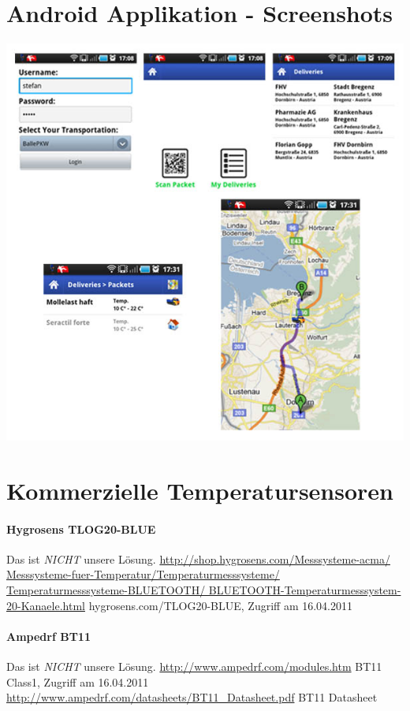 \begin{appendix}
\label{sec:appendix}

\section{Android Applikation - Screenshots}

\includegraphics[width=140mm]{files/AndroidApp.jpg}

\section{Kommerzielle Temperatursensoren}
	\paragraph{Hygrosens TLOG20-BLUE}
		Das ist \textit{NICHT} unsere Lösung.
		\url{http://shop.hygrosens.com/Messsysteme-acma/
			Messsysteme-fuer-Temperatur/Temperaturmesssysteme/
			Temperaturmesssysteme-BLUETOOTH/
			BLUETOOTH-Temperaturmesssystem-20-Kanaele.html}
			{hygrosens.com/TLOG20-BLUE, Zugriff am 16.04.2011}
	\par
	
	\paragraph{Ampedrf BT11}
		Das ist \textit{NICHT} unsere Lösung.
		\url{http://www.ampedrf.com/modules.htm}
		{BT11 Class1, Zugriff am 16.04.2011}
		\url{http://www.ampedrf.com/datasheets/BT11_Datasheet.pdf}
		{BT11 Datasheet}
	\par 


\end{appendix}
